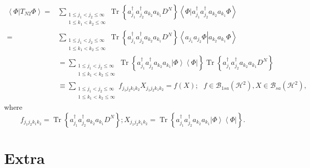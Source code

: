 \documentclass[aps,preprint]{revtex4}%
\begin{document}
\begin{align}
\left\langle \left.  \Phi\right\vert T_{N2}\Phi\right\rangle =  &
\sum_{\substack{1\leq j_{1}<j_{2}\leq\infty\\1\leq k_{1}<k_{2}\leq\infty
}}\operatorname{Tr}\left\{  a_{j_{1}}^{\dagger}a_{j_{2}}^{\dagger}a_{k_{2}%
}a_{k_{1}}D^{N}\right\}  \left\langle \left.  \Phi\right\vert a_{j_{1}%
}^{\dagger}a_{j_{2}}^{\dagger}a_{k_{2}}a_{k_{1}}\Phi\right\rangle \\
=  &  \sum_{\substack{1\leq j_{1}<j_{2}\leq\infty\\1\leq k_{1}<k_{2}\leq
\infty}}\operatorname{Tr}\left\{  a_{j_{1}}^{\dagger}a_{j_{2}}^{\dagger
}a_{k_{2}}a_{k_{1}}D^{N}\right\}  \left\langle \left.  a_{j_{1}}a_{j_{2}}%
\Phi\right\vert a_{k_{2}}a_{k_{1}}\Phi\right\rangle \\
&  =\sum_{\substack{1\leq j_{1}<j_{2}\leq\infty\\1\leq k_{1}<k_{2}\leq\infty
}}\operatorname{Tr}\left\{  a_{j_{1}}^{\dagger}a_{j_{2}}^{\dagger}a_{k_{2}%
}a_{k_{1}}\left\vert \Phi\right\rangle \left\langle \Phi\right\vert \right\}
\operatorname{Tr}\left\{  a_{j_{1}}^{\dagger}a_{j_{2}}^{\dagger}a_{k_{2}%
}a_{k_{1}}D^{N}\right\} \\
&  \equiv\sum_{\substack{1\leq j_{1}<j_{2}\leq\infty\\1\leq k_{1}<k_{2}%
\leq\infty}}f_{j_{1}j_{2}k_{1}k_{2}}X_{j_{1}j_{2}k_{1}k_{2}}=f(X);\text{ }%
f\in\mathcal{B}_{1sa}\left(  \mathcal{H}^{2}\right)  ,X\in\mathcal{B}%
_{sa}\left(  \mathcal{H}^{2}\right)  ,
\end{align}
where
\begin{equation}
f_{j_{1}j_{2}k_{1}k_{2}}=\operatorname{Tr}\left\{  a_{j_{1}}^{\dagger}%
a_{j_{2}}^{\dagger}a_{k_{2}}a_{k_{1}}D^{N}\right\}  ;X_{j_{1}j_{2}k_{1}k_{2}%
}=\operatorname{Tr}\left\{  a_{j_{1}}^{\dagger}a_{j_{2}}^{\dagger}a_{k_{2}%
}a_{k_{1}}\left\vert \Phi\right\rangle \left\langle \Phi\right\vert \right\}
.
\end{equation}


\section{Extra}
\end{document}
